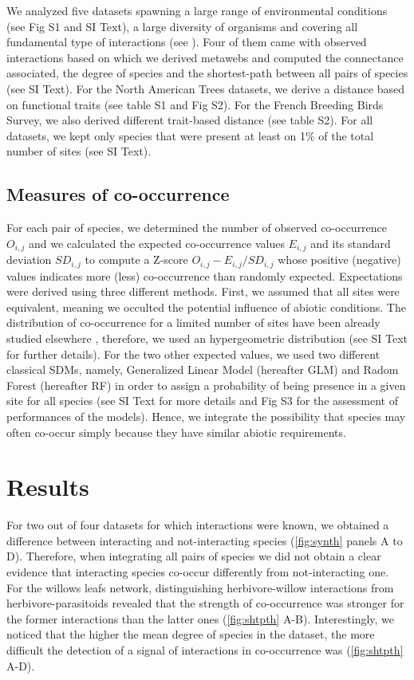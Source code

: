We analyzed five datasets spawning a large range of environmental
conditions (see Fig S1 and SI Text), a large diversity of organisms and
covering all fundamental type of interactions (see \citet{tbl:id}). Four
of them came with observed interactions based on which we derived
metawebs and computed the connectance associated, the degree of species
and the shortest-path between all pairs of species (see SI Text). For
the North American Trees datasets, we derive a distance based on
functional traits (see table S1 and Fig S2). For the French Breeding
Birds Survey, we also derived different trait-based distance (see table
S2). For all datasets, we kept only species that were present at least
on 1\% of the total number of sites (see SI Text).

\subsection{Measures of co-occurrence}\label{measures-of-co-occurrence}

For each pair of species, we determined the number of observed
co-occurrence \(O_{i,j}\) and we calculated the expected co-occurrence
values \(E_{i,j}\) and its standard deviation \(SD_{i,j}\) to compute a
Z-score \(O_{i,j}-E_{i,j}/SD_{i,j}\) \citep{Gilpin_1982} whose positive
(negative) values indicates more (less) co-occurrence than randomly
expected. Expectations were derived using three different methods.
First, we assumed that all sites were equivalent, meaning we occulted
the potential influence of abiotic conditions. The distribution of
co-occurrence for a limited number of sites have been already studied
elsewhere \citep[\citet{Veech_2013}]{Gilpin_1982}, therefore, we used an
hypergeometric distribution (see SI Text for further details). For the
two other expected values, we used two different classical SDMs, namely,
Generalized Linear Model (hereafter GLM) and Radom Forest (hereafter RF)
in order to assign a probability of being presence in a given site for
all species (see SI Text for more details and Fig S3 for the assessment
of performances of the models). Hence, we integrate the possibility that
species may often co-occur simply because they have similar abiotic
requirements.

\section{Results}\label{results}

For two out of four datasets for which interactions were known, we
obtained a difference between interacting and not-interacting species
(\ref{fig:synth} panels A to D). Therefore, when integrating all pairs
of species we did not obtain a clear evidence that interacting species
co-occur differently from not-interacting one. For the willows leafs
network, distinguishing herbivore-willow interactions from
herbivore-parasitoids revealed that the strength of co-occurrence was
stronger for the former interactions than the latter ones
(\ref{fig:shtpth} A-B). Interestingly, we noticed that the higher the
mean degree of species in the dataset, the more difficult the detection
of a signal of interactions in co-occurrence was (\ref{fig:shtpth} A-D).

